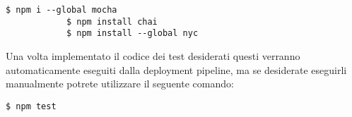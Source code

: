 \begin{center}
	\begin{minipage}{0.5\textwidth}
		\begin{lstlisting}[caption=Comandi per l'esecuzione dei test,numbers=none]
			$ npm i --global mocha
			$ npm install chai
			$ npm install --global nyc
		\end{lstlisting}
	\end{minipage}
\end{center}
\noindent
Una volta implementato il codice dei test desiderati questi verranno automaticamente eseguiti dalla deployment pipeline, ma se desiderate eseguirli manualmente potrete utilizzare il seguente comando:
\begin{center}
	\begin{minipage}{0.5\textwidth}
		\begin{lstlisting}[caption=Comandi per l'esecuzione dei test,numbers=none]
			$ npm test
		\end{lstlisting}
	\end{minipage}
\end{center}

\newpage

